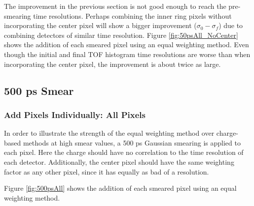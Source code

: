 \documentclass[12pt]{article}
\begin{document}
The improvement in the previous section is not good enough to reach the pre-smearing time resolutions. 
Perhaps combining the inner ring pixels without incorporating the center pixel will show a bigger improvement ($\sigma_0-\sigma_f$) due to combining detectors of similar time resolution. 
Figure \ref{fig:50psAll_NoCenter} shows the addition of each smeared pixel using an equal weighting method.
Even though the initial and final TOF histogram time resolutions are worse than when incorporating the center pixel, the improvement is about twice as large.

\subsection{500 ps Smear}
\subsubsection{Add Pixels Individually: All Pixels}
In order to illustrate the strength of the equal weighting method over charge-based methods at high smear values, a 500 ps Gaussian smearing is applied to each pixel.
Here the charge should have no correlation to the time resolution of each detector.
Additionally, the center pixel should have the same weighting factor as any other pixel, since it has equally as bad of a resolution.

Figure \ref{fig:500psAll} shows the addition of each smeared pixel using an equal weighting method.
\end{document}

